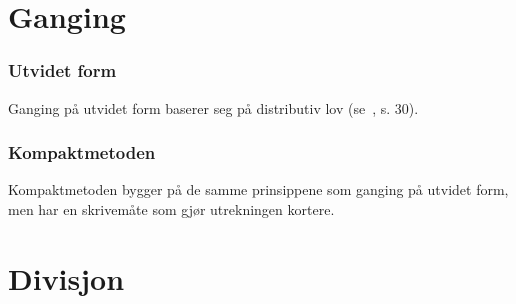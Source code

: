 \section{Ganging}
\subsubsection{Utvidet form}
Ganging på utvidet form baserer seg på distributiv lov (se \mb\,, s. 30).
\subsubsection{Kompaktmetoden}
Kompaktmetoden bygger på de samme prinsippene som ganging på utvidet form, men har en skrivemåte som gjør utrekningen kortere.
\section{Divisjon}
